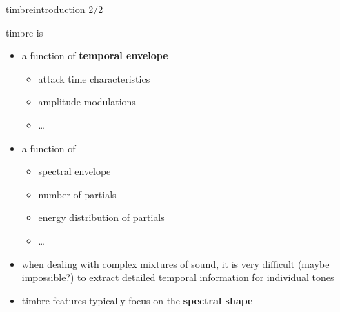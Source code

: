         \begin{frame}{timbre}{introduction 2/2}
        
            timbre is
            \begin{itemize}
                \item   a function of \textbf{temporal envelope}
                    \begin{itemize}
                        \item   attack time characteristics
                        \item   amplitude modulations
                        \item   \ldots
                    \end{itemize}
                \item<2->   a function of 
                    \begin{itemize}
                        \item   spectral envelope
                        \item   number of partials
                        \item   energy distribution of partials
                        \item   \ldots
                    \end{itemize}
            \end{itemize}

            \begin{itemize}
                \item<3->[] when dealing with complex mixtures of sound, it is very difficult (maybe impossible?) to extract detailed temporal information for individual tones
                \item<4->[$\Rightarrow$] timbre features typically focus on the \textbf{spectral shape}
            \end{itemize}
        \end{frame}

